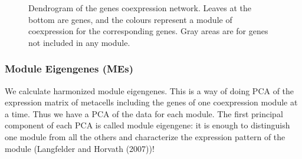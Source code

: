 \documentclass[
  letterpaper,
  DIV=11,
  numbers=noendperiod]{scrartcl}
\begin{document}
\begin{figure}[H]


\caption{\label{fig-dendro}Dendrogram of the genes coexpression network.
Leaves at the bottom are genes, and the colours represent a module of
coexpression for the corresponding genes. Gray areas are for genes not
included in any module.}

\end{figure}%

\subsubsection{Module Eigengenes (MEs)}\label{module-eigengenes-mes}

We calculate harmonized module eigengenes. This is a way of doing PCA of
the expression matrix of metacells including the genes of one
coexpression module at a time. Thus we have a PCA of the data for each
module. The first principal component of each PCA is called module
eigengene: it is enough to distinguish one module from all the others
and characterize the expression pattern of the module (Langfelder and
Horvath (2007))!
\end{document}

